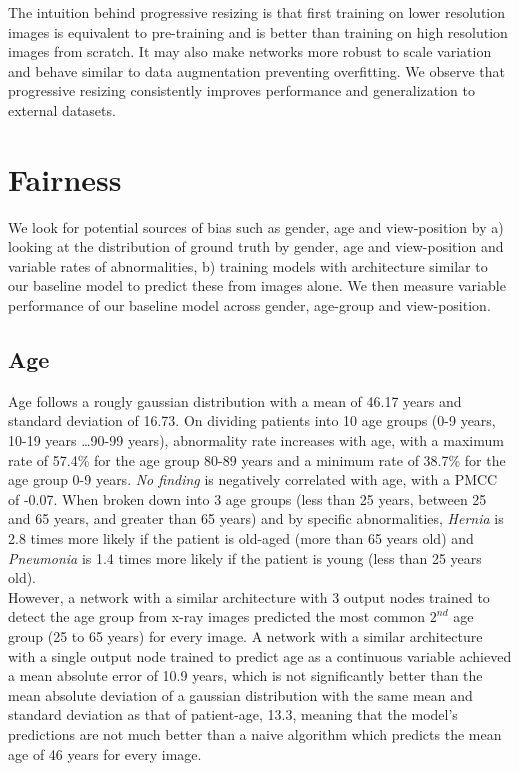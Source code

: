 \documentclass[oneside,a4paper]{article}
\begin{document}
The intuition behind progressive resizing is that first training
on lower resolution images is equivalent to pre-training and is better than
training on high resolution images from scratch. It may also make networks more
robust to scale variation and behave similar to
data augmentation preventing overfitting. We observe that progressive resizing consistently improves performance and
generalization to external datasets.

\section{Fairness}
We look for potential sources of bias such as gender, age and view-position
by a) looking at the distribution of ground truth by gender, age and view-position and variable rates of abnormalities, b) training models with architecture similar to our baseline model to predict these from images alone. We then measure variable performance of our baseline model across gender, age-group and view-position.\\

\subsection{Age}
Age follows a rougly gaussian distribution with a mean of 46.17 years and standard deviation of 16.73. On dividing patients into 10 age groups (0-9 years, 10-19 years \dots 90-99 years), abnormality rate increases with age, with a maximum rate of 57.4\% for the age group 80-89 years and a minimum rate of 38.7\% for the age group 0-9 years. \emph{No finding} is negatively correlated with age, with a PMCC of -0.07. When broken down into 3 age groups (less than 25 years, between 25 and 65 years, and greater than 65 years) and by specific abnormalities, \emph{Hernia} is 2.8 times more likely if the patient is old-aged (more than 65 years old) and \emph{Pneumonia} is 1.4 times more likely if the patient is young (less than 25 years old).\\

However, a network with a similar architecture with 3 output nodes trained to detect the age group from x-ray images predicted the most common $2^{nd}$ age group (25 to 65 years) for every image. A network with a similar architecture with a single output node trained to predict age as a continuous variable achieved a mean absolute error of 10.9 years, which is not significantly better than the mean absolute deviation of a gaussian distribution with the same mean and standard deviation as that of patient-age, 13.3, meaning that the model's predictions are not much better than a naive algorithm which predicts the mean age of 46 years for every image.\\
\end{document}
